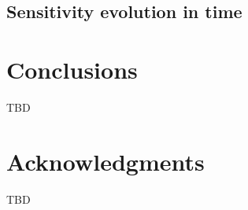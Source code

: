 \documentclass[preprint,review,12pt]{elsarticle}
\begin{document}
\subsection{Sensitivity evolution in time}


\section{Conclusions}
\label{Conclusions}

TBD

\section*{Acknowledgments}
\label{Acknowledgments}

TBD 



\end{document}
